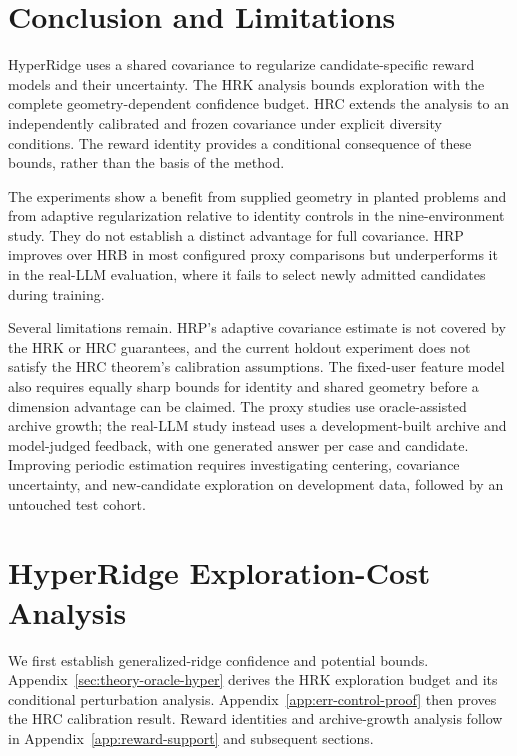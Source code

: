 \documentclass{article} %
\begin{document}
\section{Conclusion and Limitations}
\label{sec:conclusion}

HyperRidge uses a shared covariance to regularize candidate-specific reward
models and their uncertainty. The HRK analysis bounds exploration with the
complete geometry-dependent confidence budget. HRC extends the analysis to
an independently calibrated and frozen covariance under explicit diversity
conditions. The reward identity provides a conditional consequence of these
bounds, rather than the basis of the method.

The experiments show a benefit from supplied geometry in planted problems
and from adaptive regularization relative to identity controls in the
nine-environment study. They do not establish a distinct advantage for full
covariance. HRP improves over HRB in most configured proxy comparisons but
underperforms it in the real-LLM evaluation, where it fails to select newly
admitted candidates during training.

Several limitations remain. HRP's adaptive covariance estimate is not covered
by the HRK or HRC guarantees, and the current holdout experiment does not
satisfy the HRC theorem's calibration assumptions. The fixed-user feature
model also requires equally sharp bounds for identity and shared geometry
before a dimension advantage can be claimed. The proxy studies use
oracle-assisted archive growth; the real-LLM study instead uses a
development-built archive and model-judged feedback, with one generated
answer per case and candidate. Improving periodic estimation requires
investigating centering, covariance uncertainty, and new-candidate
exploration on development data, followed by an untouched test cohort.




\clearpage

\appendix

\section{HyperRidge Exploration-Cost Analysis}
\label{app:hyper-proofs}

We first establish generalized-ridge confidence and potential bounds.
Appendix~\ref{sec:theory-oracle-hyper} derives the HRK exploration budget
and its conditional perturbation analysis.
Appendix~\ref{app:err-control-proof} then proves the HRC calibration result.
Reward identities and archive-growth analysis follow in
Appendix~\ref{app:reward-support} and subsequent sections.
\end{document}
